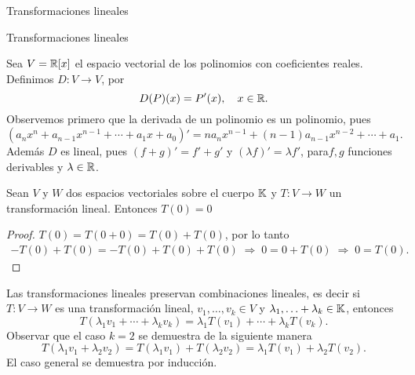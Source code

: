 \begin{chapter}{Transformaciones lineales}
\begin{section}{Transformaciones lineales}
        
            \begin{ejemplo*}
            Sea $V = \mathbb R[x]$ el espacio vectorial de los polinomios con coeficientes reales. Definimos $D:V \to V$, por
            $$
            D(P)(x) = P'(x),\quad x \in \mathbb R. 
            $$
            Observemos primero que la derivada de un polinomio es un polinomio, pues 
            $$
            (a_nx^n+ a_{n-1}x^{n-1}+\cdots + a_1 x + a_0)' = na_nx^{n-1}+ (n-1)a_{n-1}x^{n-2}+\cdots + a_1.
            $$
            Además  $D$  es lineal, pues $(f+g)' = f' + g'$ y $(\lambda f)' = \lambda f'$, para$f,g$ funciones derivables y $\lambda \in \mathbb R$.
            \end{ejemplo*} 
        
        \begin{obs*}	Sean $V$ y $W$ dos espacios vectoriales sobre el cuerpo $\mathbb K$ y 	 $T:V \to W$			un transformación lineal. Entonces $T(0) =0$
        \end{obs*}
        \begin{proof} $T(0) = T(0+0) = T(0) + T(0)$, por lo tanto 
            \begin{align*}
                -T(0) + T(0) = -T(0) + T(0)+T(0) \;\Rightarrow\; 0 = 0 +T(0) \;\Rightarrow\; 0= T(0).
            \end{align*}
        \end{proof}
        
        \begin{obs*}
            Las transformaciones lineales preservan  combinaciones lineales, es decir si $T:V \to W$ es una transformación lineal, $ v_1,\ldots,v_k \in V$ y $\lambda_1, \ldots+ \lambda_k \in \mathbb K$,  entonces
            $$
            T(\lambda_1 v_1 + \cdots+ \lambda_k v_k) = \lambda_1 T(v_1) + \cdots+ \lambda_k T(v_k).
            $$
            Observar que el caso $k=2$ se demuestra de la siguiente manera
            $$
            T(\lambda_1 v_1 +  \lambda_2 v_2) =T(\lambda_1 v_1) + T(\lambda_2 v_2) =\lambda_1 T(v_1) + \lambda_2T( v_2).
            $$
            El caso general se demuestra por inducción. 
        
        \end{obs*}
        

\end{section}
\end{chapter}
